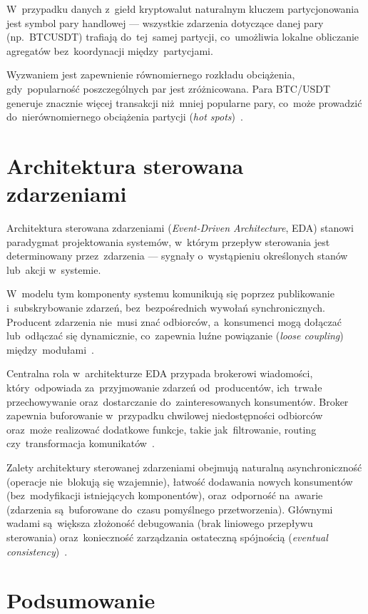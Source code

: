 W~przypadku danych z~giełd kryptowalut naturalnym kluczem partycjonowania jest symbol pary handlowej --- wszystkie
zdarzenia dotyczące danej pary (np.~BTCUSDT) trafiają do~tej~samej partycji, co~umożliwia lokalne obliczanie
agregatów bez~koordynacji między~partycjami.

Wyzwaniem jest zapewnienie równomiernego rozkładu obciążenia, gdy~popularność poszczególnych par jest zróżnicowana.
Para BTC/USDT generuje znacznie więcej transakcji niż~mniej popularne pary, co~może prowadzić do~nierównomiernego
obciążenia partycji (\textit{hot spots})~\cite{coingecko}.


\section{Architektura sterowana zdarzeniami}
\label{sec:event_driven}

Architektura sterowana zdarzeniami (\textit{Event-Driven Architecture}, EDA) stanowi paradygmat projektowania
systemów, w~którym przepływ sterowania jest determinowany przez~zdarzenia --- sygnały o~wystąpieniu określonych
stanów lub~akcji w~systemie.

W~modelu tym komponenty systemu komunikują się poprzez publikowanie i~subskrybowanie zdarzeń, bez~bezpośrednich
wywołań synchronicznych.
Producent zdarzenia nie~musi znać odbiorców, a~konsumenci mogą dołączać lub~odłączać się dynamicznie,
co~zapewnia luźne powiązanie (\textit{loose coupling}) między~modułami~\cite{edd_pub_sub}.

Centralna rola w~architekturze EDA przypada brokerowi wiadomości, który~odpowiada za~przyjmowanie zdarzeń
od~producentów, ich~trwałe przechowywanie oraz~dostarczanie do~zainteresowanych konsumentów.
Broker zapewnia buforowanie w~przypadku chwilowej niedostępności odbiorców oraz~może realizować dodatkowe
funkcje, takie jak~filtrowanie, routing czy~transformacja komunikatów~\cite{data_broker}.

Zalety architektury sterowanej zdarzeniami obejmują naturalną asynchroniczność (operacje nie~blokują się wzajemnie),
łatwość dodawania nowych konsumentów (bez~modyfikacji istniejących komponentów), oraz~odporność na~awarie
(zdarzenia są~buforowane do~czasu pomyślnego przetworzenia).
Głównymi wadami są~większa złożoność debugowania (brak liniowego przepływu sterowania) oraz~konieczność zarządzania
ostateczną spójnością (\textit{eventual consistency})~\cite{fundamentals}.


\section{Podsumowanie}
\label{sec:podsumowanie_przetwarzanie}

